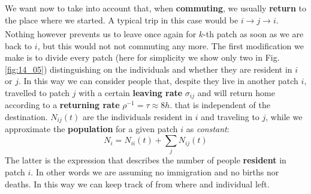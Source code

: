 \documentclass[../main/main.tex]{subfiles}
\begin{document}
We want now to take into account that, when \textbf{commuting}, we usually \textbf{return} to the place where we started. A typical trip in this case would be $i \xrightarrow{} j \xrightarrow[]{} i$. Nothing however prevents us to leave once again for $k$-th patch as soon as we are back to $i$, but this would not not commuting any more. The first modification we make is to divide every patch (here for simplicity we show only two in Fig. \ref{fig:14_05}) distinguishing on the individuals and whether they are resident in $i$ or $j$. In this way we can consider people that, despite they live in another patch $i$, travelled to patch $j$ with a certain \textbf{leaving rate} $\sigma_{ij}$ and will return home according to a \textbf{returning rate} $\rho^{-1} = \tau \approx 8h$.
that is independent of the destination. $N_{ij}(t)$ are the individuals resident in $i$ and traveling to $j$, while we approximate the \textbf{population} for a given patch $i$ as \textit{constant}:
\begin{equation}
    N_i = N_{ii}(t) + \sum_{j} N_{ij}(t)
    \label{eqn:popul_N}
\end{equation}
The latter is the expression that describes the number of people \textbf{resident} in patch $i$. In other words we are assuming no immigration and no births nor deaths. In this way we can keep track of from where and individual left.
\end{document}
